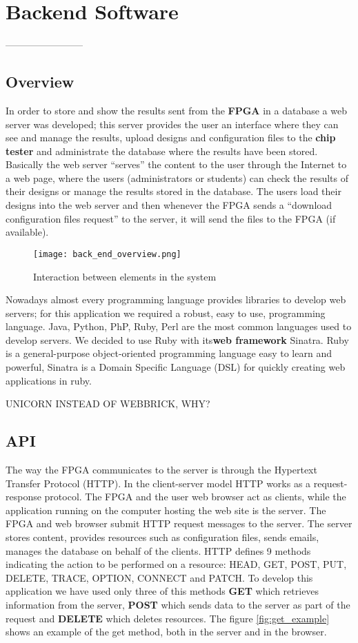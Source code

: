 \chapter{Backend Software}
------------------------

\section{Overview}
  In order to store and show the results sent from the {\bf FPGA} in a database a web server was developed; this server provides the user an interface where they can
see and manage the results, upload designs and configuration files to the {\bf chip tester} and administrate the database where the results have been stored. Basically
the web server ``serves'' the content to the user through the Internet to a web page, where the users (administrators or students) can check the results of their designs
or manage the results stored in the database. The users load their designs into the web server and then whenever the FPGA sends a ``download configuration files request''
to the server, it will send the files to the FPGA (if available).

\begin{figure}[htb]
\centering
\texttt{[image: back\_end\_overview.png]}
\caption{Interaction between elements in the system}
\label{fig:back_end_structure}
\end{figure}


 Nowadays almost every programming language provides libraries to develop web servers; for this application we required a robust, easy to use, programming language. Java, Python, PhP, Ruby,
Perl are the most common languages used to develop servers. We decided to use Ruby with its{\bf web framework} Sinatra. Ruby is a general-purpose object-oriented programming language easy to learn
and powerful, Sinatra is a Domain Specific Language (DSL) for quickly creating web applications in ruby.

UNICORN INSTEAD OF WEBBRICK, WHY?


\section{API}

The way the FPGA communicates to the server is through the Hypertext Transfer Protocol (HTTP). In the client-server model HTTP works as a request-response protocol. The FPGA and the user web browser act as clients, while the application running
on the computer hosting the web site is the server. The FPGA and web browser submit HTTP request messages to the server. The server stores content, provides resources such as configuration files, sends emails, manages the database on behalf of the clients.
HTTP defines 9 methods indicating the action to be performed on a resource: HEAD, GET, POST, PUT, DELETE, TRACE, OPTION, CONNECT and PATCH. To develop this application we have used only three of this methods {\bf GET} which retrieves information from the server,
{\bf POST} which sends data to the server as part of the request and {\bf DELETE} which deletes resources. The figure \ref{fig:get_example} shows an example of the get method, both in the server and in the browser.


